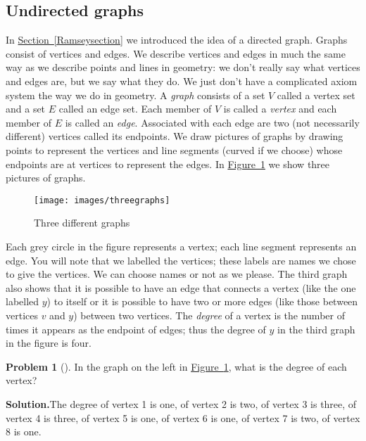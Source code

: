 \documentclass[10pt,]{book}
\theoremstyle{plain}
\theoremstyle{definition}
\newtheorem{activity}[project]{Problem}
\theoremstyle{definition}
\numberwithin{equation}{chapter}
\begin{document}
\subsection[{Undirected graphs}]{Undirected graphs}\label{graphsection}
In \hyperref[Ramseysection]{Section~\ref{Ramseysection}} we introduced the idea of a directed graph. Graphs consist of vertices and edges. We describe vertices and edges in much the same way as we describe points and lines in geometry: we don't really say what vertices and edges are, but we say what they do. We just don't have a complicated axiom system the way we do in geometry. A \emph{graph} consists of a set \(V\) called a vertex set and a set \(E\) called an edge set. Each member of \(V\) is called a \emph{vertex} and each member of \(E\) is called an \emph{edge}. Associated with each edge are two (not necessarily different) vertices called its endpoints. We draw pictures of graphs by drawing points to represent the vertices and line segments (curved if we choose) whose endpoints are at vertices to represent the edges. In \hyperref[Threegraphs]{Figure~\ref{Threegraphs}} we show three pictures of graphs.%
\begin{figure}
\centering
\texttt{[image: images/threegraphs]}
\caption{Three different graphs\label{Threegraphs}}
\end{figure}
Each grey circle in the figure represents a vertex; each line segment represents an edge. You will note that we labelled the vertices; these labels are names we chose to give the vertices. We can choose names or not as we please. The third graph also shows that it is possible to have an edge that connects a vertex (like the one labelled \(y\)) to itself or it is possible to have two or more edges (like those between vertices \(v\) and \(y\)) between two vertices. The \emph{degree} of a vertex is the number of times it appears as the endpoint of edges; thus the degree of \(y\) in the third graph in the figure is four.%
\begin{activity}[]\label{activity-100}
In the graph on the left in \hyperref[Threegraphs]{Figure~\ref{Threegraphs}}, what is the degree of each vertex?%
\par\medskip\noindent%
\textbf{Solution.}\quad The degree of vertex 1 is one, of vertex 2 is two, of vertex 3 is three, of vertex 4 is three, of vertex 5 is one, of vertex 6 is one, of vertex 7 is two, of vertex 8 is one.%
\end{activity}
\end{document}
